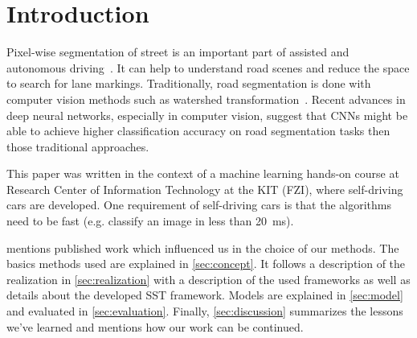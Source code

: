 
\section{Introduction}
\label{sec:introduction}
Pixel-wise segmentation of street is an important part of assisted and
autonomous driving~\cite{Tarel2009}. It can help to understand road scenes and
reduce the space to search for lane markings. Traditionally, road segmentation
is done with computer vision methods such as watershed
transformation~\cite{Beucher1990}. Recent advances in deep neural networks,
especially in computer vision, suggest that \glspl{CNN} might be able to
achieve higher classification accuracy on road segmentation tasks then those
traditional approaches.

This paper was written in the context of a machine learning hands-on course at
Research Center of Information Technology at the KIT (FZI), where self-driving
cars are developed. One requirement of self-driving cars is that the algorithms
need to be fast (e.g. classify an image in less than \SI{20}{\milli\second}).

 mentions published work which influenced us in the
choice of our methods. The basics methods used are explained in
\cref{sec:concept}. It follows a description of the realization in
\cref{sec:realization} with a description of the used frameworks as well as
details about the developed SST framework. Models are explained in
\cref{sec:model} and evaluated in \cref{sec:evaluation}. Finally,
\cref{sec:discussion} summarizes the lessons we've learned and mentions how
our work can be continued.